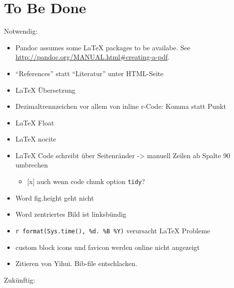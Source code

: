 \documentclass[]{book}
\providecommand{\tightlist}{%
  \setlength{\itemsep}{0pt}\setlength{\parskip}{0pt}}
\theoremstyle{definition}
\theoremstyle{definition}
\theoremstyle{remark}
\begin{document}
\hypertarget{tbd}{\chapter{To Be Done}\label{tbd}}

Notwendig:

\begin{itemize}
\tightlist
\item
  Pandoc assumes some LaTeX packages to be availabe. See
  \url{http://pandoc.org/MANUAL.html\#creating-a-pdf}.
\item
  ``References'' statt ``Literatur'' unter HTML-Seite
\item
  LaTeX Übersetzung
\item
  Dezimaltrennzeichen vor allem von inline r-Code: Komma statt Punkt
\item
  LaTeX Float
\item
  LaTeX nocite
\item
  LaTeX Code schreibt über Seitenränder -\textgreater{} manuell Zeilen
  ab Spalte 90 umbrechen

  \begin{itemize}
  \tightlist
  \item
    {[}x{]} auch wenn code chunk option \texttt{tidy}?
  \end{itemize}
\item
  Word fig.height geht nicht
\item
  Word zentriertes Bild ist linksbündig
\item
  \texttt{\textquotesingle{}r\ format(Sys.time(),\ \textquotesingle{}\%d.\ \%B\ \%Y\textquotesingle{})\textquotesingle{}}
  verursacht LaTeX Probleme
\item
  custom block icons und favicon werden online nicht angezeigt
\item
  Zitieren von Yihui. Bib-file entschlacken.
\end{itemize}

Zukünftig:
\end{document}
